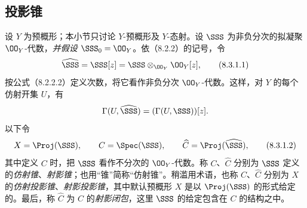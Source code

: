 \subsection{投影锥}
设 $Y$ 为预概形；本小节只讨论 $Y$-预概形及 $Y$-态射。设 $\SSS$ 为非负分次的拟凝聚 $\OO_Y$-代数，\emph{并假设 $\SSS_0=\OO_Y$}。依（8.2.2）的记号，令
\begin{equation}
\widehat{\SSS}=\SSS[z]=\SSS\otimes_{\OO_Y}\OO_Y[z],
\tag{8.3.1.1}
\end{equation}
按公式（8.2.2.2）定义次数，将它看作非负分次 $\OO_Y$-代数。这样，对 $Y$ 的每个仿射开集 $U$，有
\[
\Gamma(U,\widehat{\SSS})=(\Gamma(U,\SSS))[z].
\]
以下令
\begin{equation}
X=\Proj(\SSS),\qquad C=\Spec(\SSS),\qquad \widehat C=\Proj(\widehat{\SSS}),
\tag{8.3.1.2}
\end{equation}
其中定义 $C$ 时，把 $\SSS$ 看作不分次的 $\OO_Y$-代数。称 $C$、$\widehat C$ 分别为 $\SSS$ 定义的\emph{仿射锥}、\emph{射影锥}；也用“锥”简称“仿射锥”。稍滥用术语，也称 $C$、$\widehat C$ 分别为 $X$ 的\emph{仿射投影锥}、\emph{射影投影锥}，其中默认预概形 $X$ 是以 $\Proj(\SSS)$ 的形式给定的。最后，称 $\widehat C$ 为 $C$ 的\emph{射影闭包}，这里 $\SSS$ 的给定包含在 $C$ 的结构之中。


